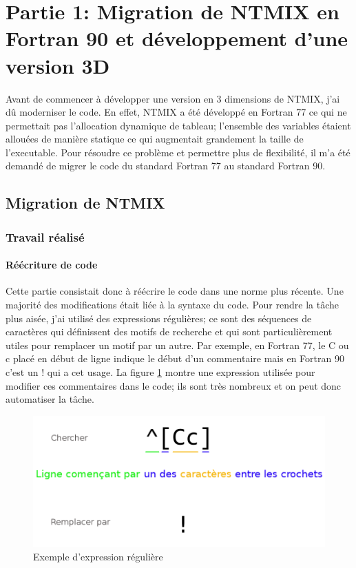 \section{Partie 1: Migration de NTMIX en Fortran 90 et développement d'une version 3D}

Avant de commencer à développer une version en 3 dimensions de NTMIX, j'ai dû moderniser le code. En effet, NTMIX a été développé en Fortran 77 ce qui ne permettait pas l'allocation dynamique de tableau; l'ensemble des variables étaient allouées de manière statique ce qui augmentait grandement la taille de l'executable. Pour résoudre ce problème et permettre plus de flexibilité, il m'a été demandé de migrer le code du standard Fortran 77 au standard Fortran 90.

\subsection{Migration de NTMIX}
\subsubsection{Travail réalisé}

\paragraph{Réécriture de code}Cette partie consistait donc à réécrire le code dans une norme plus récente. Une majorité des modifications était liée à la syntaxe du code. Pour rendre la tâche plus aisée, j'ai utilisé des expressions régulières; ce sont des séquences de caractères qui définissent des motifs de recherche et qui sont particulièrement utiles pour remplacer un motif par un autre. Par exemple, en Fortran 77, le C ou c placé en début de ligne indique le début d'un commentaire mais en Fortran 90 c'est un ! qui a cet usage. La figure \ref{fig:regex} montre une expression utilisée pour modifier ces commentaires dans le code; ils sont très nombreux et on peut donc automatiser la tâche. 

\begin{figure}[ht]
  \centering
  \includegraphics[scale=0.3]{figures/regex.png}
  \caption{\label{fig:regex}Exemple d'expression régulière}
\end{figure}

